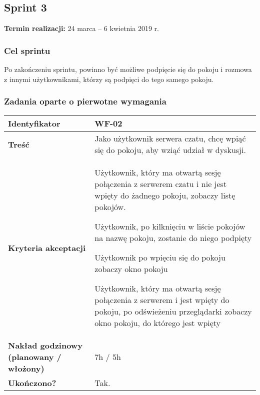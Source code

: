 \subsection{Sprint 3}

\textbf{Termin realizacji:} 24 marca -- 6 kwietnia 2019 r.

\subsubsection{Cel sprintu}
Po zakończeniu sprintu, powinno być możliwe podpięcie się do pokoju i rozmowa z
innymi użytkownikami, którzy są podpięci do tego samego pokoju.

\subsubsection{Zadania oparte o pierwotne wymagania}

\leavevmode\hbox{}

\begin{tabular}{ | l | l | }
 \hline
   \textbf{Identyfikator} &
   WF-02
   \\

 \hline
   \textbf{Treść} & \parbox[t]{11.5cm}{\strut
     Jako użytkownik serwera czatu, chcę wpiąć się do pokoju,
     aby wziąć udział w dyskusji.
   \strut}\\

 \hline
   \parbox[t]{4cm}{\textbf{Kryteria akceptacji}} & \parbox[t]{11.5cm}{\strut
     \begin{enumreq}
       \item Użytkownik, który ma otwartą sesję
       połączenia z serwerem czatu i nie jest wpięty
       do żadnego pokoju, zobaczy listę pokojów.
       \item Użytkownik, po kilknięciu w liście pokojów
       na nazwę pokoju, zostanie do niego podpięty
       \item Użytkownik po wpięciu się do pokoju zobaczy
       okno pokoju
       \item Użytkownik, który ma otwartą sesję
       połączenia z serwerem i jest wpięty do pokoju,
       po odświeżeniu przeglądarki zobaczy okno pokoju,
       do którego jest wpięty
     \end{enumreq}
     \strut}
   \\

   \hline
     \parbox[t]{4cm}{\textbf{Nakład godzinowy (planowany / włożony)}} &
     \parbox[t]{11.5cm}{\strut
       7h / 5h
     \strut}\\

       \hline
         \parbox[t]{4cm}{\textbf{Ukończono?}} &
         \parbox[t]{11.5cm}{\strut
           Tak.
         \strut}\\

         \hline
     \end{tabular}

